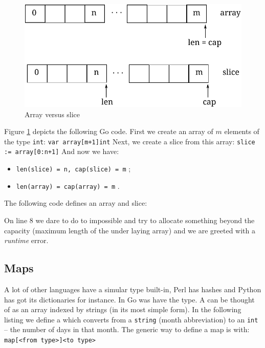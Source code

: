 \begin{figure}[H]
\caption{Array versus slice}
\label{fig:array-vs-slice}
\begin{center}
\includegraphics[scale=0.65]{fig/array-vs-slice.pdf}
\end{center}
\end{figure}
Figure \ref{fig:array-vs-slice} depicts the following Go code.
First we create an array of $m$ elements of the type \lstinline{int}:
\lstinline{var array[m+1]int}\newline
Next, we create a slice from this array:
\lstinline{slice := array[0:n+1]}\newline
And now we have:
\begin{itemize}
\item{\lstinline{len(slice) = n, cap(slice) = m}{} ;}
\item{\lstinline{len(array) = cap(array) = m}{} .}
\end{itemize}
The following code defines an array and slice:

On line 8 we dare to do to impossible and try to allocate something
beyond the capacity (maximum length of the under laying array) and
we are greeted with a \emph{runtime} error.

\subsection{Maps}
\label{sec:maps}
A lot of other languages have a simular type built-in, Perl has hashes
and Python has got its dictionaries for instance. In Go was have the
 type. A  can be thought of as an array indexed by
strings (in its most simple form).
In the following listing we define a  which converts from a
\lstinline{string} (month abbreviation) to an \lstinline{int} -- the number of days in that month. 
The generic way to define a map is with: \verb|map[<from type>]<to type>|

